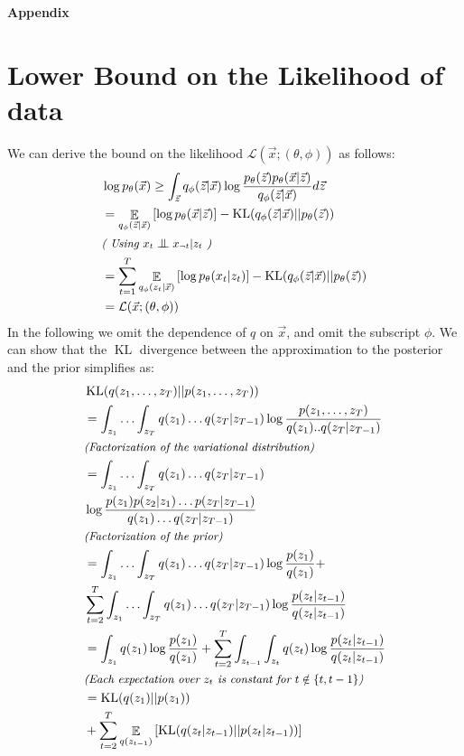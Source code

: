 \documentclass[letterpaper]{article}
\newcommand{\mathtext}[1]{\small{\textit{(#1)}}}
\newcommand{\Exp}[2]{\mathop{\mathbb{E}}_{#2}\left[#1\right]}
\DeclareMathOperator{\KL}{KL}
\newcommand{\pth}{p_\theta}
\newcommand{\qph}{q_\phi}
\newcommand{\vecx}{\vec{x}}
\newcommand{\vecz}{\vec{z}}
\newcommand{\bigCI}{\mathrel{\text{\scalebox{1.07}{$\perp\mkern-10mu\perp$}}}}
\newcommand{\lthph}{\mathcal{L}(\vecx;(\theta, \phi))}
\theoremstyle{plain}
\begin{document}
{


\clearpage
\appendix
\centerline{\large \bf Appendix}
\section{Lower Bound on the Likelihood of data\label{appsec:lb_likelihood}}

We can derive the bound on the likelihood $\lthph$ as follows:
\begin{align}
	\label{eqn:bound_likelihood_app}
&\log \pth(\vecx) \geq \int_{\vecz} \qph(\vecz|\vecx) \log \frac{\pth(\vecz)\pth(\vecx|\vecz)}{\qph(\vecz|\vecx)} d\vecz \nonumber\\
&= \Exp{\log \pth(\vecx|\vecz)}{\qph(\vecz|\vecx)} - \KL(\qph(\vecz|\vecx)||\pth(\vecz))\nonumber\\
&\mathtext{ Using $x_{t}\bigCI x_{\neg t}|z_t$ } \nonumber \\
&= \sum_{t=1}^T\Exp{\log \pth(x_t|z_t)}{\qph(z_t|\vecx)} - \KL(\qph(\vecz|\vecx)||\pth(\vecz)) \\
&= \lthph \nonumber
\end{align}
In the following we omit the dependence of $q$ on $\vecx$, and omit the subscript $\phi$.
We can show that the $\KL$ divergence between the approximation to the posterior and the prior simplifies as:
\begin{align}
	&\KL(q(z_1,\ldots,z_T)||p(z_1,\ldots,z_T))\nonumber\\
	&= \int_{z_1}\ldots\int_{z_T} q(z_1)\ldots q(z_T|z_{T-1}) \log \frac{p(z_1,\ldots,z_T)}{q(z_1).. q(z_T|z_{T-1})}\nonumber\\
	&\mathtext{Factorization of the variational distribution}\nonumber\\ 
	&= \int_{z_1}\ldots\int_{z_T} q(z_1)\ldots q(z_T|z_{T-1})\nonumber\\
	&\log \frac{p(z_1) p(z_2|z_1)\ldots p(z_T|z_{T-1})}{q(z_1)\ldots q(z_T|z_{T-1})}\nonumber\\ 
	&\mathtext{Factorization of the prior}\nonumber\\
	&= \int_{z_1}\ldots\int_{z_T} q(z_1)\ldots q(z_T|z_{T-1}) \log \frac{p(z_1)}{q(z_1)}+\nonumber\\
	&\sum_{t=2}^{T} \int_{z_1}\ldots\int_{z_T} q(z_1)\ldots q(z_T|z_{T-1}) \log\frac{p(z_t|z_{t-1})}{q(z_t|z_{t-1})}\nonumber\\
	&= \int_{z_1} q(z_1)\log\frac{p(z_1)}{q(z_1)} +  \sum_{t=2}^{T} \int_{z_{t-1}}\int_{z_{t}}q(z_t)\log\frac{p(z_t|z_{t-1})}{q(z_t|z_{t-1})}\nonumber\\
	&\mathtext{Each expectation over $z_t$ is constant for $t\notin\{t,t-1\}$}\nonumber\\
	&= \KL(q(z_1)||p(z_1)) \nonumber\\
	&+ \sum_{t=2}^{T} \Exp{\KL(q(z_t|z_{t-1})||p(z_t|z_{t-1}))}{q(z_{t-1})}\nonumber\\
\end{align}

}
\end{document}
